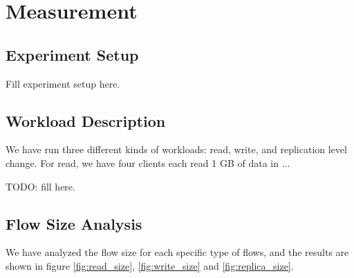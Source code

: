 \section{Measurement}
\label{section:measurement}

\subsection{\bf Experiment Setup}

Fill experiment setup here.

\subsection{\bf Workload Description}
We have run three different kinds of workloads: read, write, and replication level change. For read, we have four clients each read 1 GB of data in ...

TODO: fill here.

\subsection{\bf Flow Size Analysis}
We have analyzed the flow size for each specific type of flows, and the results are shown in figure \ref{fig:read_size}, \ref{fig:write_size} and \ref{fig:replica_size}.

